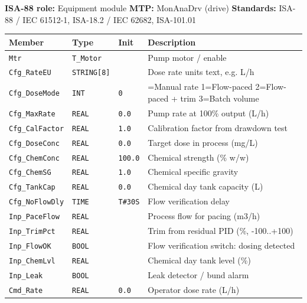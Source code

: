 {\small\textbf{ISA-88 role:} Equipment module \quad \textbf{MTP:} MonAnaDrv (drive) \quad \textbf{Standards:} ISA-88 /\allowbreak{} IEC 61512-1, ISA-18.2 /\allowbreak{} IEC 62682, ISA-101.01}
{\footnotesize
\begin{longtable}{@{}>{\raggedright\arraybackslash}p{3.4cm}>{\raggedright\arraybackslash}p{3.3cm}>{\raggedright\arraybackslash}p{1.3cm}>{\raggedright\arraybackslash}p{6.4cm}@{}}
\toprule
\rowcolor{tblhead}\textbf{Member} & \textbf{Type} & \textbf{Init} & \textbf{Description} \\
\midrule
\endhead
\texttt{Mtr} & \texttt{T\_Motor} &  & Pump motor /\allowbreak{} enable \\
\texttt{Cfg\_RateEU} & \texttt{STRING[8]} &  & Dose rate units text, e.g. L/\allowbreak{}h \\
\texttt{Cfg\_DoseMode} & \texttt{INT} & \texttt{0} & 0=Manual rate 1=Flow-paced 2=Flow-paced + trim 3=Batch volume \\
\texttt{Cfg\_MaxRate} & \texttt{REAL} & \texttt{0.0} & Pump rate at 100\% output (L/\allowbreak{}h) \\
\texttt{Cfg\_CalFactor} & \texttt{REAL} & \texttt{1.0} & Calibration factor from drawdown test \\
\texttt{Cfg\_DoseConc} & \texttt{REAL} & \texttt{0.0} & Target dose in process (mg/\allowbreak{}L) \\
\texttt{Cfg\_ChemConc} & \texttt{REAL} & \texttt{100.0} & Chemical strength (\% w/\allowbreak{}w) \\
\texttt{Cfg\_ChemSG} & \texttt{REAL} & \texttt{1.0} & Chemical specific gravity \\
\texttt{Cfg\_TankCap} & \texttt{REAL} & \texttt{0.0} & Chemical day tank capacity (L) \\
\texttt{Cfg\_NoFlowDly} & \texttt{TIME} & \texttt{T\#30S} & Flow verification delay \\
\texttt{Inp\_PaceFlow} & \texttt{REAL} &  & Process flow for pacing (m3/\allowbreak{}h) \\
\texttt{Inp\_TrimPct} & \texttt{REAL} &  & Trim from residual PID (\%, -100..+100) \\
\texttt{Inp\_FlowOK} & \texttt{BOOL} &  & Flow verification switch: dosing detected \\
\texttt{Inp\_ChemLvl} & \texttt{REAL} &  & Chemical day tank level (\%) \\
\texttt{Inp\_Leak} & \texttt{BOOL} &  & Leak detector /\allowbreak{} bund alarm \\
\texttt{Cmd\_Rate} & \texttt{REAL} & \texttt{0.0} & Operator dose rate (L/\allowbreak{}h) \\

\end{longtable}}
